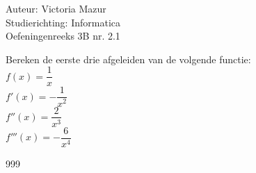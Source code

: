 \documentclass[a4paper]{article}
\begin{document}
  
\noindent \large Auteur: Victoria Mazur \\
\noindent \large Studierichting: Informatica\\
\noindent \large Oefeningenreeks 3B nr. 2.1\\

\medskip

\normalsize

Bereken de eerste drie afgeleiden van de volgende functie: \\

$f(x) = \dfrac{1}{x}$ \\

$f'(x) = -\dfrac{1}{x^2}$ \\

$f''(x) = \dfrac{2}{x^3}$ \\

$f'''(x) = -\dfrac{6}{x^4}$ \\

\begin{thebibliography}{999}
\end{thebibliography}
\end{document}
